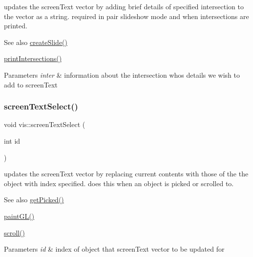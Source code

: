 updates the screen\+Text vector by adding brief details of specified intersection to the vector as a string. required in pair slideshow mode and when intersections are printed.

\begin{DoxySeeAlso}{See also}
\mbox{\hyperlink{classvis_a131dcf83ee61359b99624ea2538898a4}{create\+Slide()}} 

\mbox{\hyperlink{classvis_a9d087bde79e6856772dc3a1f6f89294e}{print\+Intersections()}} 
\end{DoxySeeAlso}

\begin{DoxyParams}{Parameters}
{\em inter} & information about the intersection whos details we wish to add to screen\+Text \\
\hline
\end{DoxyParams}
\mbox{\label{classvis_add33479c093e0128dc708bd766556ba9}} 
\subsubsection{\texorpdfstring{screen\+Text\+Select()}{screenTextSelect()}}
{\footnotesize\ttfamily void vis\+::screen\+Text\+Select (\begin{DoxyParamCaption}\item[{int}]{id }\end{DoxyParamCaption})}

updates the screen\+Text vector by replacing current contents with those of the the object with index specified. does this when an object is picked or scrolled to.

\begin{DoxySeeAlso}{See also}
\mbox{\hyperlink{classvis_a9d1f882814f73ee4e49dbeb7102b008c}{get\+Picked()}} 

\mbox{\hyperlink{classvis_ace835462bb98cad495e829c08e1a26ea}{paint\+G\+L()}} 

\mbox{\hyperlink{classvis_addb1c0bca50661279c4ddaa441b54da5}{scroll()}} 
\end{DoxySeeAlso}

\begin{DoxyParams}{Parameters}
{\em id} & index of object that screen\+Text vector to be updated for \\
\hline
\end{DoxyParams}
\mbox{\label{classvis_addb1c0bca50661279c4ddaa441b54da5}} 
